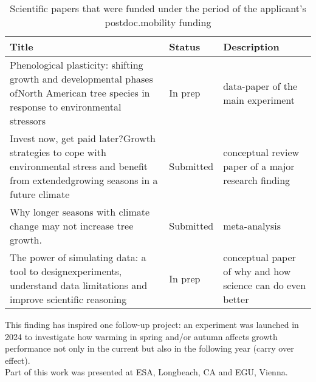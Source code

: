 \documentclass{article}
\begin{document}
\begin{table}[H]
	\caption{Scientific papers that were funded under the period of the applicant's postdoc.mobility funding}
	\centering
	\begin{tabular}{|p{8.7cm}|p{2cm}|p{5.0cm}|}
		\hline
		\textbf{Title} & \textbf{Status} & \textbf{Description} \\ 
		\hline
		Phenological plasticity: shifting growth and developmental phases ofNorth American tree species in response to environmental stressors & In prep & data-paper of the main experiment \\ 
		\hline
		Invest now, get paid later?Growth strategies to cope with environmental stress and benefit from extendedgrowing seasons in a future climate & Submitted & conceptual review paper of a major research finding \\ 
		\hline
		Why longer seasons with climate change may not increase tree growth. & Submitted & meta-analysis \\ 
		\hline
		The power of simulating data: a tool to designexperiments, understand data limitations and improve scientific reasoning & In prep & conceptual paper of why and how science can do even better\\ 
		\hline
	\end{tabular}
\end{table}
	
	This finding has inspired one follow-up project: an experiment was launched in 2024 to investigate how warming in spring and/or autumn affects growth performance not only in the current but also in the following year (carry over effect). \\
	Part of this work was presented at ESA, Longbeach, CA and EGU, Vienna. 
	
	
	
	
	
	
	
	
	
	
	
	
	
	
	
\end{document}
